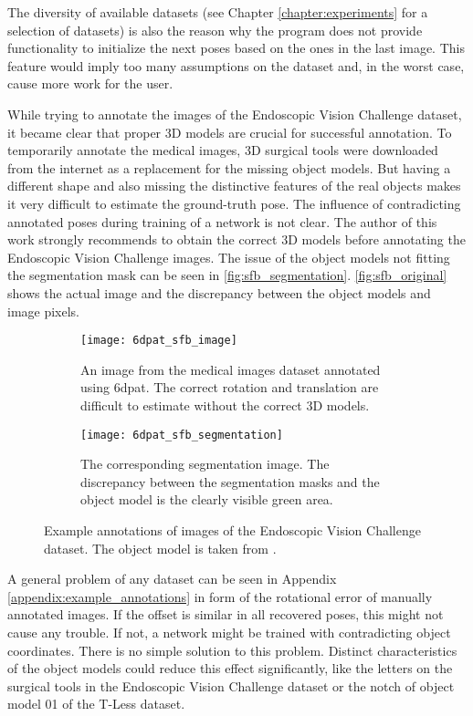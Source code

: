 The diversity of available datasets (see Chapter \ref{chapter:experiments} for a selection of datasets) is also the reason why the program does not provide functionality to initialize the next poses based on the ones in the last image. This feature would imply too many assumptions on the dataset and, in the worst case, cause more work for the user. 

While trying to annotate the images of the Endoscopic Vision Challenge dataset, it became clear that proper 3D models are crucial for successful annotation. To temporarily annotate the medical images, 3D surgical tools were downloaded from the internet as a replacement for the missing object models. But having a different shape and also missing the distinctive features of the real objects makes it very difficult to estimate the ground-truth pose. The influence of contradicting annotated poses during training of a network is not clear. The author of this work strongly recommends to obtain the correct 3D models before annotating the Endoscopic Vision Challenge images. The issue of the object models not fitting the segmentation mask can be seen in \fig \ref{fig:sfb_segmentation}. \fig \ref{fig:sfb_original} shows the actual image and the discrepancy between the object models and image pixels.

\begin{figure}
	\begin{subfigure}[t]{0.47\textwidth}
		\centering
    	\texttt{[image: 6dpat\_sfb\_image]}
    	\caption{An image from the medical images dataset annotated using \ac{6dpat}. The correct rotation and translation are difficult to estimate without the correct 3D models.}
    	\label{fig:6dpat_sfb_image}
	\end{subfigure} 
	\hfill
	\begin{subfigure}[t]{0.47\textwidth}
		\centering
    	\texttt{[image: 6dpat\_sfb\_segmentation]}
    	\caption{The corresponding segmentation image. The discrepancy between the segmentation masks and the object model is the clearly visible green area.}
    	\label{fig:6dpat_sfb_segmentation}
	\end{subfigure} 
	\caption{Example annotations of images of the Endoscopic Vision Challenge dataset. The object model is taken from \cite{3d_scalpel_online}.}
	\label{fig:6dpat_sfb}
\end{figure} 

A general problem of any dataset can be seen in Appendix \ref{appendix:example_annotations} in form of the rotational error of manually annotated images. If the offset is similar in all recovered poses, this might not cause any trouble. If not, a network might be trained with contradicting object coordinates. There is no simple solution to this problem. Distinct characteristics of the object models could reduce this effect significantly, like the letters on the surgical tools in the Endoscopic Vision Challenge dataset or the notch of object model 01 of the T-Less dataset.

